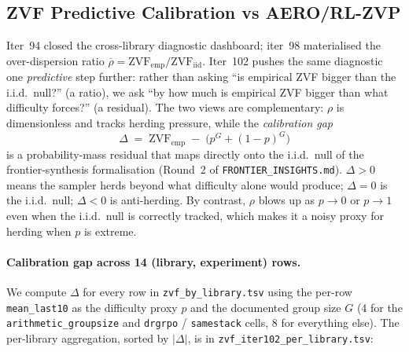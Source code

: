 
\subsection{ZVF Predictive Calibration vs AERO/RL-ZVP}
\label{sec:zvf-calibration}

Iter~94 closed the cross-library diagnostic dashboard; iter~98 materialised
the over-dispersion ratio $\overline{\rho} = \mathrm{ZVF}_{\mathrm{emp}}/
\mathrm{ZVF}_{\mathrm{iid}}$. Iter~102 pushes the same diagnostic one
\emph{predictive} step further: rather than asking ``is empirical ZVF bigger
than the i.i.d.\ null?'' (a ratio), we ask ``by how much is empirical ZVF
bigger than what difficulty forces?'' (a residual). The two views are
complementary: $\rho$ is dimensionless and tracks herding pressure, while
the \emph{calibration gap}
\begin{equation}\label{eq:delta}
\Delta \;=\; \mathrm{ZVF}_{\mathrm{emp}} \;-\; \bigl(p^{G}+(1-p)^{G}\bigr)
\end{equation}
is a probability-mass residual that maps directly onto the i.i.d.\ null of
the frontier-synthesis formalisation (Round~2 of \texttt{FRONTIER\_INSIGHTS.md}).
$\Delta>0$ means the sampler herds beyond what difficulty alone would
produce; $\Delta=0$ is the i.i.d.\ null; $\Delta<0$ is anti-herding. By
contrast, $\rho$ blows up as $p\to0$ or $p\to1$ even when the i.i.d.\ null
is correctly tracked, which makes it a noisy proxy for herding when $p$ is
extreme.

\paragraph{Calibration gap across 14 (library, experiment) rows.}
We compute $\Delta$ for every row in
\texttt{zvf\_by\_library.tsv} using the per-row \texttt{mean\_last10} as
the difficulty proxy $p$ and the documented group size $G$ (4 for the
\texttt{arithmetic\_groupsize} and \texttt{drgrpo} / \texttt{samestack}
cells, 8 for everything else).  The per-library aggregation, sorted by
$|\Delta|$, is in \texttt{zvf\_iter102\_per\_library.tsv}:

